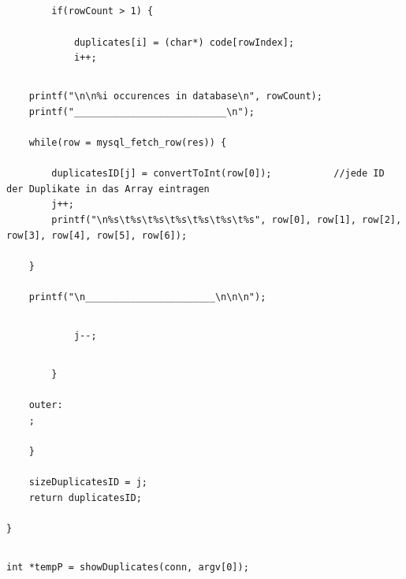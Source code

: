 \documentclass[12pt]{report}
\begin{document}
\subsection{}
\begin{lstlisting}
        if(rowCount > 1) {

            duplicates[i] = (char*) code[rowIndex];
            i++;
\end{lstlisting}

\subsection{}
\begin{lstlisting}
    printf("\n\n%i occurences in database\n", rowCount);
    printf("___________________________\n");

    while(row = mysql_fetch_row(res)) {

        duplicatesID[j] = convertToInt(row[0]);           //jede ID der Duplikate in das Array eintragen
        j++;
        printf("\n%s\t%s\t%s\t%s\t%s\t%s\t%s", row[0], row[1], row[2], row[3], row[4], row[5], row[6]);

    }

    printf("\n_______________________\n\n\n");
\end{lstlisting}


\subsection{}
\begin{lstlisting}
            j--;
\end{lstlisting}

\subsection{}
\begin{lstlisting}
        }

    outer:
    ;

    }

    sizeDuplicatesID = j;
    return duplicatesID;
    
}
\end{lstlisting}

\subsection{}
\begin{lstlisting}
int *tempP = showDuplicates(conn, argv[0]);
\end{lstlisting}
\end{document}
